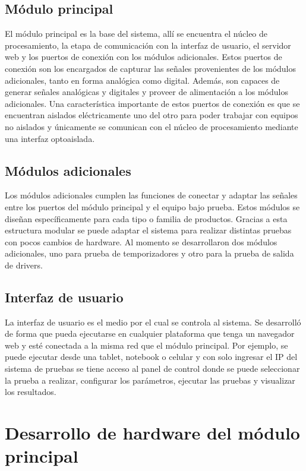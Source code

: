 \subsection{Módulo principal}
El módulo principal es la base del sistema, allí se encuentra el núcleo de procesamiento, la etapa de comunicación con la interfaz de usuario, el servidor web y los puertos de conexión con los módulos adicionales. Estos puertos de conexión son los encargados de capturar las señales provenientes de los módulos adicionales, tanto en forma analógica como digital. Además, son capaces de generar señales analógicas y digitales y proveer de alimentación a los módulos adicionales.
Una característica importante de estos puertos de conexión es que se encuentran aislados eléctricamente uno del otro para poder trabajar con equipos no aislados y únicamente se  comunican con el núcleo de procesamiento mediante una interfaz optoaislada.

\subsection{Módulos adicionales}
Los módulos adicionales cumplen las funciones de conectar y adaptar las señales entre los puertos del módulo principal y el equipo bajo prueba. Estos módulos se diseñan específicamente para cada tipo o familia de productos. Gracias a esta estructura modular se puede adaptar el sistema para realizar distintas pruebas con pocos cambios de hardware.
Al momento se desarrollaron dos módulos adicionales, uno para prueba de temporizadores y otro para la prueba de salida de drivers.

\subsection{Interfaz de usuario}
La interfaz de usuario es el medio por el cual se controla al sistema. Se desarrolló de forma que pueda ejecutarse en cualquier plataforma que tenga un navegador web y esté conectada a la misma red que el módulo principal. Por ejemplo, se puede ejecutar desde una tablet, notebook o celular y con solo ingresar el IP del sistema de pruebas se tiene acceso al panel de control donde se puede seleccionar la prueba a realizar, configurar los parámetros, ejecutar las pruebas y visualizar los resultados.

\section{Desarrollo de hardware del módulo principal}

